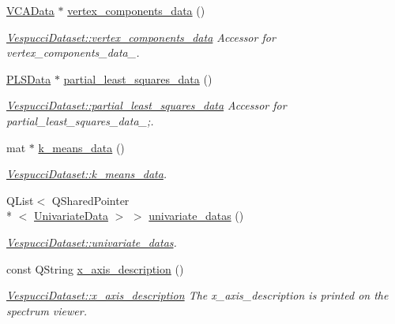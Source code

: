 \begin{DoxyCompactItemize}
\item 
\hyperlink{class_v_c_a_data}{V\+C\+A\+Data} $\ast$ \hyperlink{class_vespucci_dataset_a0129e80bf2e5358d45085e9684e7812a}{vertex\+\_\+components\+\_\+data} ()
\begin{DoxyCompactList}\small\item\em \hyperlink{class_vespucci_dataset_a0129e80bf2e5358d45085e9684e7812a}{Vespucci\+Dataset\+::vertex\+\_\+components\+\_\+data} Accessor for vertex\+\_\+components\+\_\+data\+\_\+. \end{DoxyCompactList}\item 
\hyperlink{class_p_l_s_data}{P\+L\+S\+Data} $\ast$ \hyperlink{class_vespucci_dataset_ab6837c459330d8706dd6b2f2189d69b8}{partial\+\_\+least\+\_\+squares\+\_\+data} ()
\begin{DoxyCompactList}\small\item\em \hyperlink{class_vespucci_dataset_ab6837c459330d8706dd6b2f2189d69b8}{Vespucci\+Dataset\+::partial\+\_\+least\+\_\+squares\+\_\+data} Accessor for partial\+\_\+least\+\_\+squares\+\_\+data\+\_\+;. \end{DoxyCompactList}\item 
mat $\ast$ \hyperlink{class_vespucci_dataset_ac15a3d31b8a9ea58e114a935c0ac869d}{k\+\_\+means\+\_\+data} ()
\begin{DoxyCompactList}\small\item\em \hyperlink{class_vespucci_dataset_ac15a3d31b8a9ea58e114a935c0ac869d}{Vespucci\+Dataset\+::k\+\_\+means\+\_\+data}. \end{DoxyCompactList}\item 
Q\+List$<$ Q\+Shared\+Pointer\\*
$<$ \hyperlink{class_univariate_data}{Univariate\+Data} $>$ $>$ \hyperlink{class_vespucci_dataset_a3efe2f88f3ca441b640635c04196153e}{univariate\+\_\+datas} ()
\begin{DoxyCompactList}\small\item\em \hyperlink{class_vespucci_dataset_a3efe2f88f3ca441b640635c04196153e}{Vespucci\+Dataset\+::univariate\+\_\+datas}. \end{DoxyCompactList}\item 
const Q\+String \hyperlink{class_vespucci_dataset_acb6a4de101573ac93f5fcb5dd5e38c5c}{x\+\_\+axis\+\_\+description} ()
\begin{DoxyCompactList}\small\item\em \hyperlink{class_vespucci_dataset_acb6a4de101573ac93f5fcb5dd5e38c5c}{Vespucci\+Dataset\+::x\+\_\+axis\+\_\+description} The x\+\_\+axis\+\_\+description is printed on the spectrum viewer. \end{DoxyCompactList}\item 

\end{DoxyCompactItemize}
